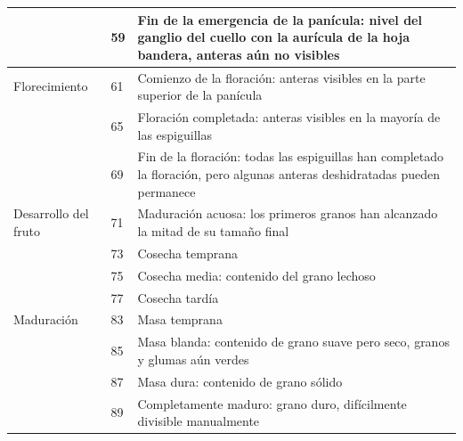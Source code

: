 \begin{longtable}{p{3cm}p{1cm}p{9cm}}
                                           & 59   & Fin de la emergencia de la panícula: nivel del ganglio del cuello con la aurícula de la hoja bandera, anteras aún no visibles            \\ \hline
Florecimiento                              & 61   & Comienzo de la floración: anteras visibles en la parte superior de la panícula                                                           \\
                                           & 65   & Floración completada: anteras visibles en la mayoría de las espiguillas                                                                  \\
                                           & 69   & Fin de la floración: todas las espiguillas han completado la floración, pero algunas anteras deshidratadas pueden permanece              \\ \hline
Desarrollo del fruto                       & 71   & Maduración acuosa: los primeros granos han alcanzado la mitad de su tamaño final                                                         \\
                                           & 73   & Cosecha temprana                                                                                                                         \\
                                           & 75   & Cosecha media: contenido del grano lechoso                                                                                               \\
                                           & 77   & Cosecha tardía                                                                                                                           \\ \hline
Maduración                                 & 83   & Masa temprana                                                                                                                            \\
                                           & 85   & Masa blanda: contenido de grano suave pero seco, granos y glumas aún verdes                                                              \\
                                           & 87   & Masa dura: contenido de grano sólido                                                                                                     \\
                                           & 89   & Completamente maduro: grano duro, difícilmente divisible manualmente                                                                     \\ \hline

\end{longtable}
